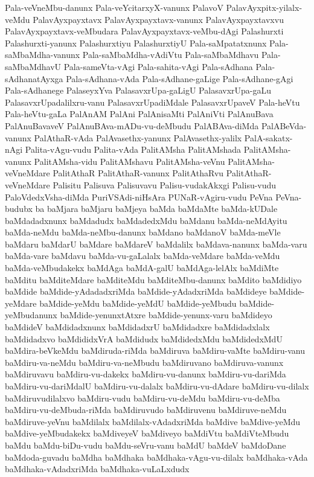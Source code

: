 {Pala-veVneMbu-danunx
Pala-veYcitarxyX-vanunx
PalavoV
PalavAyxpitx-yilalx-veMdu
PalavAyxpayxtavx
PalavAyxpayxtavx-vanunx
PalavAyxpayxtavxvu
PalavAyxpayxtavx-veMbudara
PalavAyxpayxtavx-veMbu-dAgi
Palashurxti
Palashurxti-yanunx
Palashurxtiyu
PalashurxtiyU
Pala-saMpatatxnunx
Pala-saMbaMdha-vanunx
Pala-saMbaMdha-vAdiVtu
Pala-saMbaMdhavu
Pala-saMbaMdhavU
Pala-sameVta-vAgi
Pala-sahita-vAgi
Pala-sAdhana
Pala-sAdhanatAyxga
Pala-sAdhana-vAda
Pala-sAdhane-gaLige
Pala-sAdhane-gAgi
Pala-sAdhanege
PalaseyxYva
PalasavxrUpa-gaLigU
PalasavxrUpa-gaLu
PalasavxrUpadalilxru-vanu
PalasavxrUpadiMdale
PalasavxrUpaveV
Pala-heVtu
Pala-heVtu-gaLa
PalAnAM
PalAni
PalAnisaMti
PalAniVti
PalAnuBava
PalAnuBavaveV
PalAnuBAva-mADu-vu-deMbudu
PalABAva-diMda
PalABeVda-vanunx
PalAthaR-vAda
PalAvasethx-yanunx
PalAvasethx-yalilx
PalA-sakatx-nAgi
Palita-vAgu-vudu
Palita-vAda
PalitAMsha
PalitAMshada
PalitAMsha-vanunx
PalitAMsha-vidu
PalitAMshavu
PalitAMsha-veVnu
PalitAMsha-veVneMdare
PalitAthaR
PalitAthaR-vanunx
PalitAthaRvu
PalitAthaR-veVneMdare
Palisitu
Palisuva
Palisuvavu
Palisu-vudakAkxgi
Palisu-vudu
PaloVdedxVsha-diMda
PuriVSAdi-niHsAra
PUNaR-vAgiru-vudu
PeVna
PeVna-budubx
ba
baMjara
baMjaru
baMjeya
baMda
baMdaMte
baMda-kUDale
baMdadadxnunx
baMdadudx
baMdadedxMdu
baMdanu
baMda-neMdAyitu
baMda-neMdu
baMda-neMbu-danunx
baMdano
baMdanoV
baMda-meVle
baMdaru
baMdarU
baMdare
baMdareV
baMdalilx
baMdava-nanunx
baMda-varu
baMda-vare
baMdavu
baMda-vu-gaLalalx
baMda-veMdare
baMda-veMdu
baMda-veMbudakekx
baMdAga
baMdA-galU
baMdAga-lelAlx
baMdiMte
baMditu
baMditeMdare
baMditeMdu
baMditeMbu-danunx
baMdito
baMdidiyo
baMdide
baMdide-yAdadadxriMda
baMdide-yAdadxriMda
baMdideye
baMdide-yeMdare
baMdide-yeMdu
baMdide-yeMdU
baMdide-yeMbudu
baMdide-yeMbudanunx
baMdide-yenunxtAtxre
baMdide-yenunx-varu
baMdideyo
baMdideV
baMdidadxnunx
baMdidadxrU
baMdidadxre
baMdidadxlalx
baMdidadxvo
baMdididxVrA
baMdidudx
baMdidedxMdu
baMdidedxMdU
baMdira-beVkeMdu
baMdiruda-riMda
baMdiruva
baMdiru-vaMte
baMdiru-vanu
baMdiru-va-neMdu
baMdiru-va-neMbudu
baMdiruvano
baMdiruva-vanunx
baMdiruvavu
baMdiru-vu-dakekx
baMdiru-vu-danunx
baMdiru-vu-dariMda
baMdiru-vu-dariMdalU
baMdiru-vu-dalalx
baMdiru-vu-dAdare
baMdiru-vu-dilalx
baMdiruvudilalxvo
baMdiru-vudu
baMdiru-vu-deMdu
baMdiru-vu-deMba
baMdiru-vu-deMbuda-riMda
baMdiruvudo
baMdiruvenu
baMdiruve-neMdu
baMdiruve-yeVnu
baMdilalx
baMdilalx-vAdadxriMda
baMdive
baMdive-yeMdu
baMdive-yeMbudakekx
baMdiveyeV
baMdiveyo
baMdiVtu
baMdiVteMbudu
baMdu
baMdu-biDu-vudu
baMdu-seVru-vanu
baMdU
baMdeV
baMdoDane
baMdoda-guvadu
baMdha
baMdhaka
baMdhaka-vAgu-vu-dilalx
baMdhaka-vAda
baMdhaka-vAdadxriMda
baMdhaka-vuLaLxdudx
}
